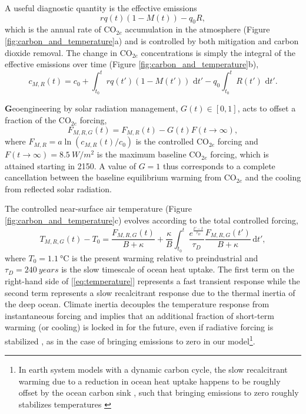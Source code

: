 \documentclass[9pt,twocolumn,twoside,lineno]{pnas-new}
\begin{document}
A useful diagnostic quantity is the effective emissions
\begin{equation}
    rq(t)(1-M(t)) - q_{0}R,
    \label{eq:effective-emissions}
\end{equation} which is the annual rate of CO$_{2e}$ accumulation in the atmosphere (Figure \ref{fig:carbon_and_temperature}a) and is controlled by both mitigation and carbon dioxide removal.
The change in CO$_{2e}$ concentrations is simply the integral of the effective emissions over time (Figure \ref{fig:carbon_and_temperature}b),
\begin{equation}
    c_{M,R}(t) = c_{0} + \int_{t_{0}}^{t} rq(t')(1-M(t')) \text{ d}t' - q_{0} \int_{t_{0}}^{t} R(t')\text{ d}t'.
\end{equation}

\textbf{G}eoengineering by solar radiation management, $G(t) \in [0,1]$, acts to offset a fraction of the CO$_{2e}$ forcing, 
\begin{equation}
    F_{M,R,G}(t) = F_{M,R}(t) - G(t) F(t \rightarrow \infty),
\end{equation}
where $F_{M,R} = a \ln(c_{M,R}(t) / c_{0})$ is the controlled CO$_{2e}$ forcing and $F(t \rightarrow \infty) = \SI{8.5}{W/m^{2}}$ is the maximum baseline CO$_{2e}$ forcing, which is attained starting in 2150. A value of $G = 1$ thus corresponds to a complete cancellation between the baseline equilibrium warming from CO$_{2e}$ and the cooling from reflected solar radiation.

The controlled near-surface air temperature (Figure \ref{fig:carbon_and_temperature}c) evolves according to the total controlled forcing,
\begin{equation}
    T_{M,R,G}(t) - T_{0} = \frac{F_{M,R,G}(t)}{B + \kappa} + \frac{\kappa}{B} \int_{t_{0}}^{t} \frac{e^{\frac{t'-t}{\tau_{D}}}}{\tau_{D}} \frac{F_{M,R,G}(t')}{B+\kappa} \, \text{d}t',
    \label{eq:temperature}
\end{equation}
where $T_{0} = \SI{1.1}{\celsius}$ is the present warming relative to preindustrial and $\tau_{D} = \SI{240}{years}$ is the slow timescale of ocean heat uptake. The first term on the right-hand side of [\ref{eq:temperature}] represents a fast transient response while the second term represents a slow recalcitrant response due to the thermal inertia of the deep ocean. Climate inertia decouples the temperature response from instantaneous forcing and implies that an additional fraction of short-term warming (or cooling) is locked in for the future, even if radiative forcing is stabilized \citep{lickley_time_2019}, as in the case of bringing emissions to zero in our model\footnote{In earth system models with a dynamic carbon cycle, the slow recalcitrant warming due to a reduction in ocean heat uptake happens to be roughly offset by the ocean carbon sink \cite{solomon_irreversible_2009}, such that bringing emissions to zero roughly stabilizes temperatures \citep{matthews_stabilizing_2008}}.
\end{document}
